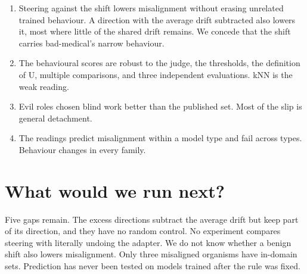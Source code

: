 \documentclass[10pt]{article}
\begin{document}
\begin{enumerate}
\item Steering against the shift lowers misalignment without erasing unrelated trained behaviour. A direction with the average drift subtracted also lowers it, most where little of the shared drift remains. We concede that the shift carries bad-medical's narrow behaviour.
\item The behavioural scores are robust to the judge, the thresholds, the definition of U, multiple comparisons, and three independent evaluations. kNN is the weak reading.
\item Evil roles chosen blind work better than the published set. Most of the slip is general detachment.
\item The readings predict misalignment within a model type and fail across types. Behaviour changes in every family.
\end{enumerate}

\section{What would we run next?}

Five gaps remain.
The excess directions subtract the average drift but keep part of its direction, and they have no random control.
No experiment compares steering with literally undoing the adapter.
We do not know whether a benign shift also lowers misalignment.
Only three misaligned organisms have in-domain sets.
Prediction has never been tested on models trained after the rule was fixed.
\end{document}
